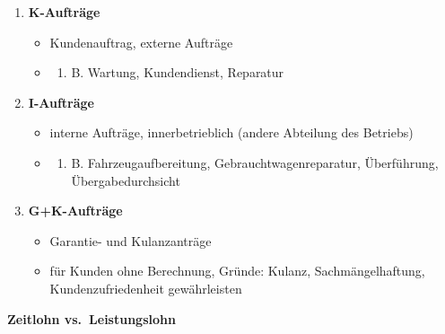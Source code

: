 \begin{enumerate}
\item
  \textbf{K-Aufträge}

  \begin{itemize}
  \item
    Kundenauftrag, externe Aufträge
  \item
    \begin{enumerate}
    \def\labelenumii{\alph{enumii}.}
    \setcounter{enumii}{25}
    \item
      B. Wartung, Kundendienst, Reparatur
    \end{enumerate}
  \end{itemize}
\item
  \textbf{I-Aufträge}

  \begin{itemize}
  \item
    interne Aufträge, innerbetrieblich (andere Abteilung des Betriebs)
  \item
    \begin{enumerate}
    \def\labelenumii{\alph{enumii}.}
    \setcounter{enumii}{25}
    \item
      B. Fahrzeugaufbereitung, Gebrauchtwagenreparatur, Überführung,
      Übergabedurchsicht
    \end{enumerate}
  \end{itemize}
\item
  \textbf{G+K-Aufträge}

  \begin{itemize}
  \item
    Garantie- und Kulanzanträge
  \item
    für Kunden ohne Berechnung, Gründe: Kulanz, Sachmängelhaftung,
    Kundenzufriedenheit gewährleisten
  \end{itemize}
\end{enumerate}

\textbf{Zeitlohn vs.~Leistungslohn}


